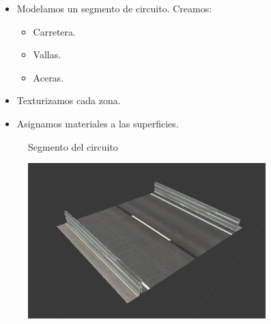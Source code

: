 \documentclass[notes,slidesec,a4]{seminar}
\begin{document}
\begin{hslide}
	\begin{itemize}
	\item Modelamos un segmento de circuito. Creamos:
	\begin{itemize}
		\item Carretera.
		\item Vallas.
		\item Aceras.
	\end{itemize}
	\item Texturizamos cada zona.
	\item Asignamos materiales a las superficies.
\end{itemize}
\end{hslide}

\begin{hslide}
	\begin{center}
		\begin{figure}
			\begin{center}
				Segmento del circuito
			\end{center}
			\includegraphics[width=0.82\textwidth]{MonacoSegmento.png}
		\end{figure}
	\end{center}
\end{hslide}
\end{document}
